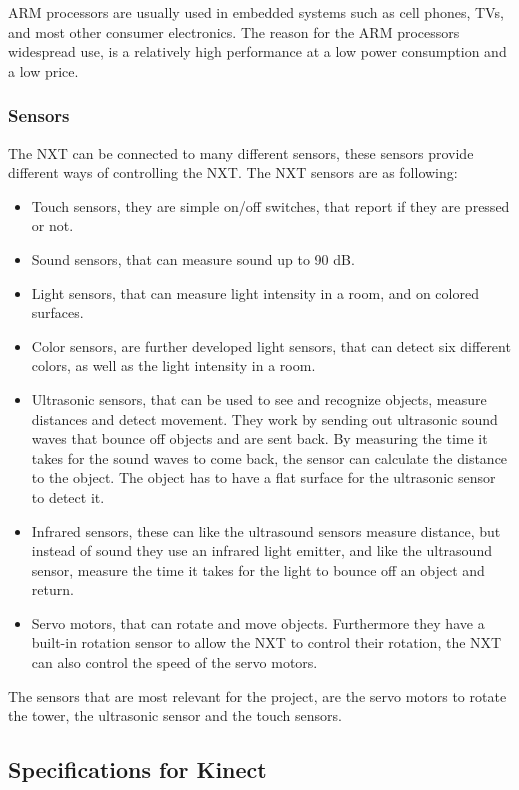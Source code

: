 ARM processors are usually used in embedded systems such as cell phones, TVs, and most other consumer electronics. The reason for the ARM processors widespread use, is a relatively high performance at a low power consumption and a low price.

\subsubsection{Sensors}
The NXT can be connected to many different sensors, these sensors provide different ways of controlling the NXT.
The NXT sensors are as following\cite{whatisnxt}:

\begin{itemize}
\item Touch sensors, they are simple on/off switches, that report if they are pressed or not.
\item Sound sensors, that can measure sound up to 90 dB.
\item Light sensors, that can measure light intensity in a room, and on colored surfaces.
\item Color sensors, are further developed light sensors, that can detect six different colors, as well as the light intensity in a room.
\item Ultrasonic sensors, that can be used to see and recognize objects, measure distances and detect movement. They work by sending out ultrasonic sound waves that bounce off objects and are sent back. By measuring the time it takes for the sound waves to come back, the sensor can calculate the distance to the object. The object has to have a flat surface for the ultrasonic sensor to detect it.
\item Infrared sensors, these can like the ultrasound sensors measure distance, but instead of sound they use an infrared light emitter, and like the ultrasound sensor, measure the time it takes for the light to bounce off an object and return.
\item Servo motors, that can rotate and move objects. Furthermore they have a built-in rotation sensor to allow the NXT to control their rotation, the NXT can also control the speed of the servo motors.
\end{itemize}

The sensors that are most relevant for the project, are the servo motors to rotate the tower, the ultrasonic sensor and the touch sensors.

\subsection{Specifications for Kinect}


